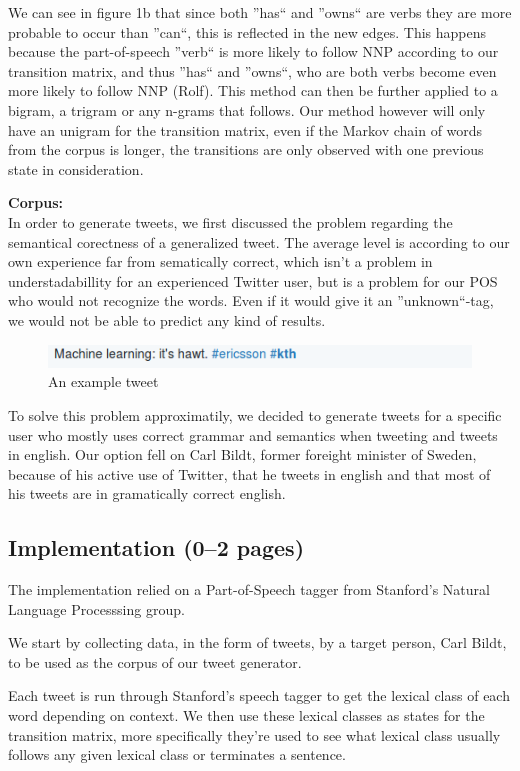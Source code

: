 \documentclass[a4paper,12pt]{article}
\begin{document}
We can see in figure 1b that since both ''has`` and ''owns`` are verbs they are more probable to occur than ''can``, this is reflected in the new edges. 
This happens because the part-of-speech ''verb`` is more likely to follow NNP according to our transition matrix, and thus ''has`` and ''owns``, who are 
both verbs become even more likely to follow NNP (Rolf). This method can then be further applied to a bigram, a trigram or any n-grams that follows. 
Our method however will only have an unigram for the transition matrix, even if the Markov chain of words from the corpus is longer, 
the transitions are only observed with one previous state in consideration.


\textbf{Corpus:}\\
In order to generate tweets, we first discussed the problem regarding the semantical corectness of a generalized tweet.
The average level is according to our own experience far from sematically correct, which isn't a problem in understadabillity for an experienced Twitter user,
but is a problem for our POS who would not recognize the words. Even if it would give it an ''unknown``-tag, we would not be able to predict any kind of results.

\begin{figure}[h!]
  \centering
  \includegraphics[width=1\linewidth]{machine_learning}
  \caption{An example tweet}
\end{figure}

To solve this problem approximatily, we decided to generate tweets for a specific user who mostly uses correct grammar and semantics when tweeting and tweets in english.
Our option fell on Carl Bildt, former foreight minister of Sweden, because of his active use of Twitter, 
that he tweets in english and that most of his tweets are in gramatically correct english.

\subsection{Implementation (0--2 pages)}
\label{sec:impl}
The implementation relied on a Part-of-Speech tagger from Stanford's Natural Language Processsing group.

We start by collecting data, in the form of tweets, by a target person, Carl Bildt, to be used as the corpus of our tweet generator.

Each tweet is run through Stanford's speech tagger to get the lexical class of each word depending on context.
We then use these lexical classes as states for the transition matrix, more specifically they're used to see what lexical class usually follows any given lexical class or terminates a sentence.
\end{document}
